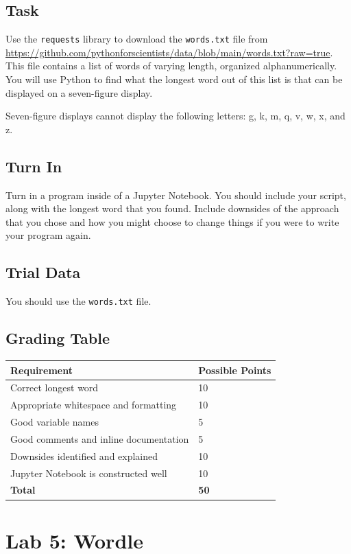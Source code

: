 \subsection*{Task}
Use the \verb|requests| library to download the \verb|words.txt| file from \\\href{https://github.com/pythonforscientists/data/blob/main/words.txt?raw=true}{https://github.com/pythonforscientists/data/blob/main/words.txt?raw=true}. This file contains a list of words of varying length, organized alphanumerically. You will use Python to find what the longest word out of this list is that can be displayed on a seven-figure display.\par
Seven-figure displays cannot display the following letters: g, k, m, q, v, w, x, and z.
\subsection*{Turn In}
Turn in a program inside of a Jupyter Notebook. You should include your script, along with the longest word that you found. Include downsides of the approach that you chose and how you might choose to change things if you were to write your program again.
\subsection*{Trial Data}
You should use the \verb|words.txt| file.
\subsection*{Grading Table}
\begin{tabular}{|l|l|}
\hline
Requirement & Possible Points \\ \hline
Correct longest word & 10 \\ \hline
Appropriate whitespace and formatting & 10 \\ \hline
Good variable names & 5 \\ \hline
Good comments and inline documentation & 5 \\ \hline
Downsides identified and explained & 10 \\ \hline
Jupyter Notebook is constructed well & 10 \\ \hline
\hline
\textbf{Total} & \textbf{50} \\ \hline
\end{tabular}

\section*{Lab 5: Wordle}
